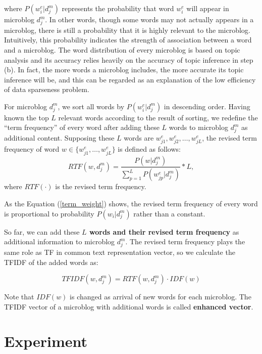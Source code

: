 \documentclass[11pt]{article}
\begin{document}
\noindent where $P(w^{e}_{i}|d^{m}_{j})$ represents the probability that word $w^{e}_{i}$ will appear in microblog $d^{m}_{j}$. In other words, though some words may not actually appears in a microblog, there is still a probability that it is highly relevant to the microblog. Intuitively, this probability indicates the strength of association between a word and a microblog. The word distribution of every microblog  is based on topic analysis and its accuracy relies heavily on the accuracy of topic inference in step (b). In fact, the more words a microblog includes, the more accurate its topic inference will be, and this can be regarded as an explanation of the low efficiency of data sparseness problem.

For microblog $d^{m}_{j}$, we sort all words by $P(w^{e}_{i}|d^{m}_{j})$ in descending order. Having known the top $L$ relevant words according to the result of sorting, we redefine the ``term frequency'' of every word after adding these $L$ words to microblog $d^{m}_{j}$ as additional content. Supposing these $L$ words are $w^{e}_{j1},w^{e}_{j2},\ldots,w^{e}_{jL}$, the revised term frequency of word $w\in \{w^{e}_{j1},\ldots,w^{e}_{jL}\}$ is defined as follows:
{\normalsize
\begin{equation}\label{term_weight}
RTF(w, d^{m}_{j})= \frac{P(w|d^{m}_{j})}{\sum_{p=1}^{L}P(w^{e}_{jp}|d^{m}_{j})}*L,
\end{equation}
}
where $RTF(\cdot)$ is the revised term frequency.

As the Equation (\ref{term_weight}) shows, the revised term frequency of every word is proportional to probability $P(w_{i}|d^{m}_{j})$ rather than a constant.

So far, we can add these {\bf $L$ words and their revised term frequency} as additional information to microblog $d^{m}_{j}$. The revised term frequency plays the same role as TF in common text representation vector, so we calculate the TFIDF of the added words as:

\begin{equation}\label{tfidf}
TFIDF(w,d^{m}_{j})=RTF(w, d^{m}_{j})\cdot IDF(w)
\end{equation}

Note that $IDF(w)$ is changed as arrival of new words for each microblog.
The TFIDF vector of a microblog with additional words is called {\bf enhanced vector}.

\section{Experiment}
\end{document}
